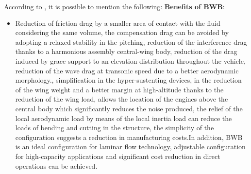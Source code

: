 According to \cite{CHEN2019}, it is possible to mention the following: \textbf{Benefits of BWB}:
\begin{itemize}
    \item Reduction of friction drag by a smaller area of contact with the fluid considering the same volume, the compensation drag can be avoided by adopting a relaxed stability in the pitching, reduction of the interference drag thanks to a harmonious assembly central-wing body, reduction of the drag induced by grace support to an elevation distribution throughout the vehicle, reduction of the wave drag at transonic speed due to a better aerodynamic morphology., simplification in the hyper-sustenting devices, in the reduction of the wing weight and a better margin at high-altitude thanks to the reduction of the wing load, allows the location of the engines above the central body which significantly reduces the noise produced, the relief of the local aerodynamic load by means of the local inertia load can reduce the loads of bending and cutting in the structure, the simplicity of the configuration suggests a reduction in manufacturing costs.In addition, BWB is an ideal configuration for laminar flow technology, adjustable configuration for high-capacity applications and significant cost reduction in direct operations can be achieved.
\end{itemize}
